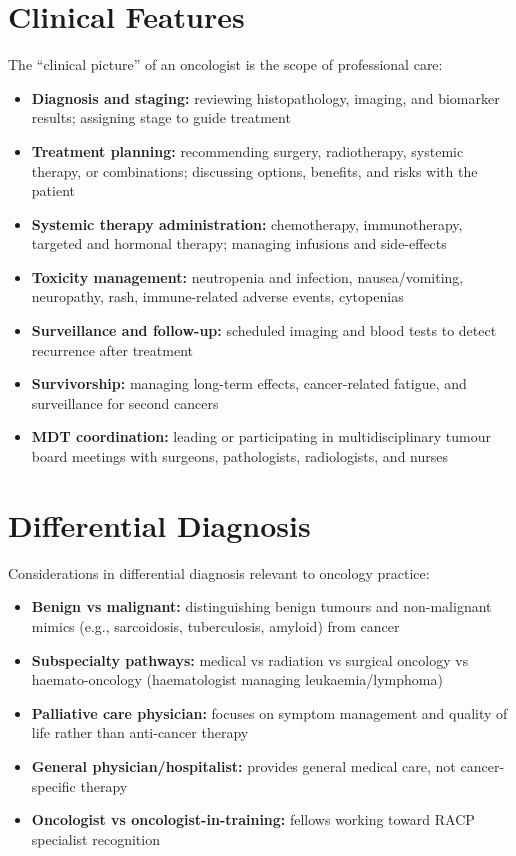 \section*{Clinical Features}
The ``clinical picture'' of an oncologist is the scope of professional care:
\begin{itemize}
    \item \textbf{Diagnosis and staging:} reviewing histopathology, imaging, and biomarker results; assigning stage to guide treatment
    \item \textbf{Treatment planning:} recommending surgery, radiotherapy, systemic therapy, or combinations; discussing options, benefits, and risks with the patient
    \item \textbf{Systemic therapy administration:} chemotherapy, immunotherapy, targeted and hormonal therapy; managing infusions and side-effects
    \item \textbf{Toxicity management:} neutropenia and infection, nausea/vomiting, neuropathy, rash, immune-related adverse events, cytopenias
    \item \textbf{Surveillance and follow-up:} scheduled imaging and blood tests to detect recurrence after treatment
    \item \textbf{Survivorship:} managing long-term effects, cancer-related fatigue, and surveillance for second cancers
    \item \textbf{MDT coordination:} leading or participating in multidisciplinary tumour board meetings with surgeons, pathologists, radiologists, and nurses
\end{itemize}

\section*{Differential Diagnosis}
Considerations in differential diagnosis relevant to oncology practice:
\begin{itemize}
    \item \textbf{Benign vs malignant:} distinguishing benign tumours and non-malignant mimics (e.g., sarcoidosis, tuberculosis, amyloid) from cancer
    \item \textbf{Subspecialty pathways:} medical vs radiation vs surgical oncology vs haemato-oncology (haematologist managing leukaemia/lymphoma)
    \item \textbf{Palliative care physician:} focuses on symptom management and quality of life rather than anti-cancer therapy
    \item \textbf{General physician/hospitalist:} provides general medical care, not cancer-specific therapy
    \item \textbf{Oncologist vs oncologist-in-training:} fellows working toward RACP specialist recognition
\end{itemize}

